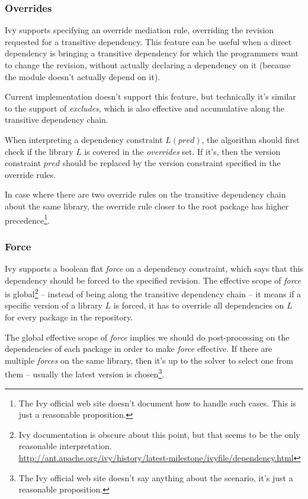 \subsubsection{Overrides}

Ivy supports specifying an override mediation rule, overriding the revision requested for a transitive dependency. This feature can be useful when a direct dependency is bringing a transitive dependency for which the programmers want to change the revision, without actually declaring a dependency on it (because the module doesn't actually depend on it).

Current implementation doesn't support this feature, but technically it's similar to the support of \emph{excludes}, which is also effective and accumulative along the transitive dependency chain.

When interpreting a dependency constraint $L(pred)$, the algorithm should first check if the library $L$ is covered in the \emph{overrides} set. If it's, then the version constraint $pred$ should be replaced by the version constraint specified in the override rules.

In case where there are two override rules on the transitive dependency chain about the same library, the override rule closer to the root package has higher precedence\footnote{The Ivy official web site doesn't document how to handle such cases. This is just a reasonable proposition.}.

\subsubsection{Force}

Ivy supports a boolean flat \emph{force} on a dependency constraint, which says that this dependency
should be forced to the specified revision. The effective scope of \emph{force} is global\footnote{Ivy documentation is obscure about this point, but that seems to be the only reasonable interpretation. \\\url{http://ant.apache.org/ivy/history/latest-milestone/ivyfile/dependency.html}} -- instead of being along the transitive dependency chain -- it means if a specific version of a library $L$ is forced, it has to override all dependencies on $L$ for every package in the repository.

The global effective scope of \emph{force} implies we should do post-processing on the dependencies of each package in order to make \emph{force} effective. If there are multiple \emph{forces} on the same library, then it's up to the solver to select one from them -- usually the latest version is chosen\footnote{The Ivy official web site doesn't say anything about the scenario, it's just a reasonable proposition.}.

